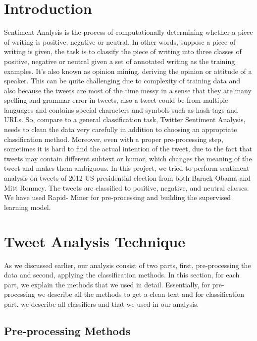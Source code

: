 \documentclass[letterpaper, 12pt]{article}
\begin{document}
\section{Introduction}
Sentiment Analysis is the process of computationally determining whether a piece of writing is positive, negative or neutral. In other words, suppose a piece of writing is given, the task is to classify the piece of writing into three classes of positive, negative or neutral given a set of annotated writing as the training examples.   It’s also known as opinion mining, deriving the opinion or attitude of a speaker. This can be quite challenging due to complexity of training data and also because the tweets are most of the time messy in a sense that they are many spelling and grammar error in tweets, also a tweet could be from multiple languages and contains special characters and symbols such as hash-tags and URLs. So, compare to a general classification task, Twitter Sentiment Analysis, needs to clean the data very carefully in addition to choosing an appropriate classification method. Moreover, even with a proper pre-processing step, sometimes it is hard to find the actual intention of the tweet, due to the fact that tweets may contain different subtext or humor, which changes the meaning of the tweet and makes them ambiguous.  In this project, we tried to perform sentiment analysis on tweets of 2012 US presidential election from both Barack Obama and Mitt Romney. The tweets are classified to positive, negative, and neutral classes. We have used Rapid- Miner for pre-processing and building the supervised learning model.




\section{Tweet Analysis Technique}
\vspace*{10pt}

As we discussed earlier, our analysis consist of two parts, first, pre-processing the data and second, applying the classification methods. In this section, for each part, we explain the methods that we used in detail. Essentially, for pre-processing we describe all the methods to get a clean text and  for classification part, we describe all classifiers and that we used in our analysis.   


\vspace*{10pt}
\subsection{Pre-processing Methods}
\end{document}
